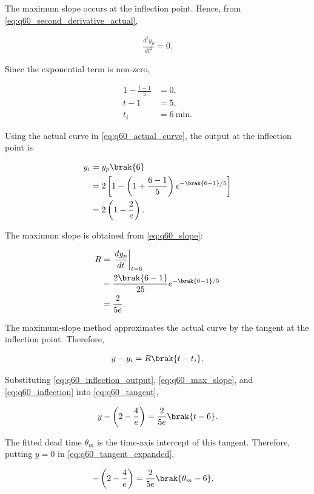 \begin{enumerate}[label=\thesubsection.\arabic*, ref=\thesubsection.\theenumi,itemsep=0pt]
The maximum slope occurs at the inflection point. Hence, from
\eqref{eq:q60_second_derivative_actual},

\begin{align}
\frac{d^2y_p}{dt^2}=0.
\end{align}

Since the exponential term is non-zero,

\begin{align}
1-\frac{t-1}{5}&=0,
\\
t-1&=5,
\\
t_i&=6~\text{min}.
\label{eq:q60_inflection}
\end{align}

Using the actual curve in \eqref{eq:q60_actual_curve}, the output at
the inflection point is

\begin{align}
y_i
&=y_p\brak{6}
\\
&=
2\left[
1-\left(1+\frac{6-1}{5}\right)
e^{-\brak{6-1}/5}
\right]
\\
&=
2\left(1-\frac{2}{e}\right).
\label{eq:q60_inflection_output}
\end{align}

The maximum slope is obtained from \eqref{eq:q60_slope}:

\begin{align}
R
&=
\left.\frac{dy_p}{dt}\right|_{t=6}
\\
&=
\frac{2\brak{6-1}}{25}
e^{-\brak{6-1}/5}
\\
&=
\frac{2}{5e}.
\label{eq:q60_max_slope}
\end{align}

The maximum-slope method approximates the actual curve by the tangent
at the inflection point. Therefore,

\begin{align}
y-y_i=R\brak{t-t_i}.
\label{eq:q60_tangent}
\end{align}

Substituting \eqref{eq:q60_inflection_output},
\eqref{eq:q60_max_slope}, and \eqref{eq:q60_inflection} into
\eqref{eq:q60_tangent},

\begin{align}
y-\left(2-\frac{4}{e}\right)
=
\frac{2}{5e}\brak{t-6}.
\label{eq:q60_tangent_expanded}
\end{align}

The fitted dead time $\theta_m$ is the time-axis intercept of this
tangent. Therefore, putting $y=0$ in
\eqref{eq:q60_tangent_expanded},

\begin{align}
-\left(2-\frac{4}{e}\right)
&=
\frac{2}{5e}\brak{\theta_m-6}.
\end{align}


\end{enumerate}
